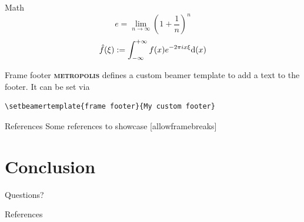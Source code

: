 \documentclass[9pt,UTF8]{ctexbeamer}
\newcommand{\themename}{\textbf{\textsc{metropolis}}\xspace}
\begin{document}
\begin{frame}{Math}
	\begin{equation}
    e = \lim_{n\to \infty} \left(1 + \frac{1}{n}\right)^n 
	\end{equation}
	\begin{equation}
    \hat{f}(\xi):=\int_{-\infty}^{+\infty}f(x)e^{-2\pi i x \xi}{\rm d}(x)
	\end{equation}
\end{frame}


{%
\begin{frame}[fragile]{Frame footer}
    \themename defines a custom beamer template to add a text to the footer. It can be set via
    \begin{verbatim}\setbeamertemplate{frame footer}{My custom footer}\end{verbatim}
\end{frame}
}

\begin{frame}{References}
  Some references to showcase [allowframebreaks] \cite{knuth92,ConcreteMath,Simpson,Er01,greenwade93}
\end{frame}

\section{Conclusion}

{
\begin{frame}[standout]
  Questions?
\end{frame}
}

\appendix

\begin{frame}[allowframebreaks]{References}

  
  

\end{frame}
\end{document}
